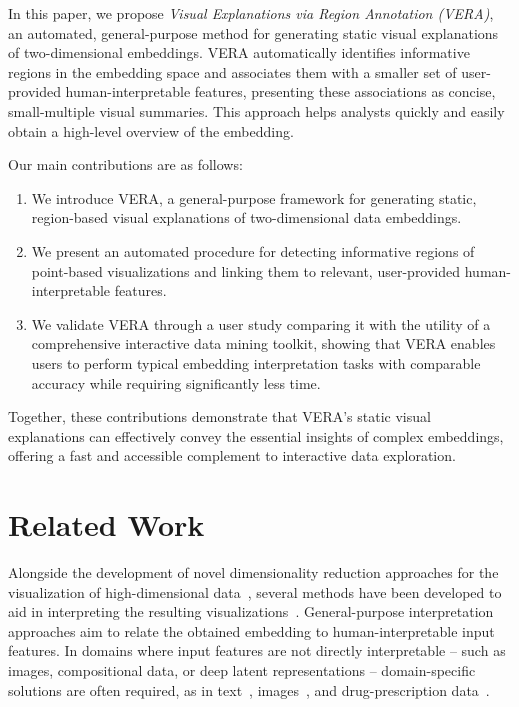 \documentclass[lettersize,journal]{IEEEtran}
\begin{document}
In this paper, we propose \textit{Visual Explanations via Region Annotation (VERA)}, an automated, general-purpose method for generating static visual explanations of two-dimensional embeddings. VERA automatically identifies informative regions in the embedding space and associates them with a smaller set of user-provided human-interpretable features, presenting these associations as concise, small-multiple visual summaries. This approach helps analysts quickly and easily obtain a high-level overview of the embedding.

Our main contributions are as follows:
\begin{enumerate}
  \item We introduce VERA, a general-purpose framework for generating static, region-based visual explanations of two-dimensional data embeddings.
  \item We present an automated procedure for detecting informative regions of point-based visualizations and linking them to relevant, user-provided human-interpretable features.
  \item We validate VERA through a user study comparing it with the utility of a comprehensive interactive data mining toolkit, showing that VERA enables users to perform typical embedding interpretation tasks with comparable accuracy while requiring significantly less time.
\end{enumerate}

Together, these contributions demonstrate that VERA’s static visual explanations can effectively convey the essential insights of complex embeddings, offering a fast and accessible complement to interactive data exploration.

\section{Related Work}
\label{sec:related_work}

Alongside the development of novel dimensionality reduction approaches for the visualization of high-dimensional data~\cite{Kruskal1978,Maaten2008,McInnes2018}, several methods have been developed to aid in interpreting the resulting visualizations~\cite{ChengMueller2016,Marcilio2021,Fujiwara2020}.
General-purpose interpretation approaches aim to relate the obtained embedding to human-interpretable input features.
In domains where input features are not directly interpretable -- such as images, compositional data, or deep latent representations -- domain-specific solutions are often required, as in text~\cite{Heimerl2016,WangHohmanChau2023}, images~\cite{Liu2019,Ye2024}, and drug-prescription data~\cite{Policar2023}.
\end{document}
